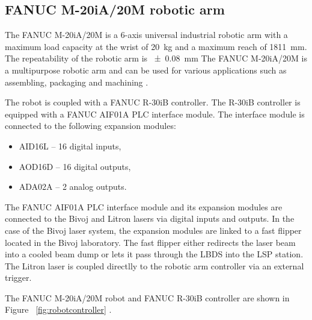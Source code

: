 \subsection{FANUC M-20iA/20M robotic arm}

The FANUC M-20iA/20M is a 6-axis universal industrial robotic arm with a maximum load capacity at the wrist of \SI{20}{\kg} and a maximum reach of \SI{1811}{\mm}. The repeatability of the robotic arm is \SI{+-0.08}{\mm} The FANUC M-20iA/20M is a multipurpose robotic arm and can be used for various applications such as assembling, packaging and machining \cite{fanucrobot}.

The robot is coupled with a FANUC R-30iB controller. The R-30iB controller is equipped with a FANUC AIF01A PLC interface module. The interface module is connected to the following expansion modules:

\begin{itemize}
    \item AID16L -- 16 digital inputs,
    \item AOD16D -- 16 digital outputs,
    \item ADA02A -- 2 analog outputs. \cite{fanucunitmanual}
\end{itemize}

The FANUC AIF01A PLC interface module and its expansion modules are connected to the Bivoj and Litron lasers via digital inputs and outputs. In the case of the Bivoj laser system, the expansion modules are linked to a fast flipper located in the Bivoj laboratory. The fast flipper either redirects the laser beam into a cooled beam dump or lets it pass through the LBDS into the LSP station. The Litron laser is coupled directlly to the robotic arm controller via an external trigger. 


The  FANUC M-20iA/20M robot and FANUC R-30iB controller are shown in Figure~ \ref{fig:robotcontroller} \cite{fanucrobotcontroller}.


